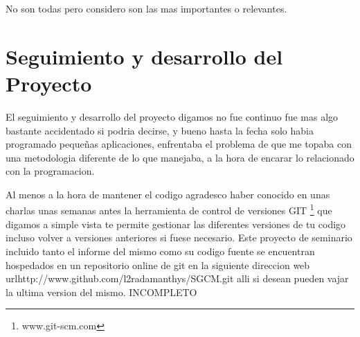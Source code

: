 No son todas pero considero son las mas importantes o relevantes.


\section{Seguimiento y desarrollo del Proyecto}

El seguimiento y desarrollo del proyecto digamos no fue continuo fue mas algo 
bastante accidentado si podria decirse, y bueno hasta la fecha solo habia 
programado pequeñas aplicaciones, enfrentaba el problema de que me topaba con 
una metodologia diferente de lo que manejaba, a la hora de encarar lo 
relacionado con la programacion. 

Al menos a la hora de mantener el codigo agradesco haber conocido en unas charlas
unas semanas antes la herramienta de control de versiones GIT \footnote{www.git-scm.com}
que digamos a simple vista te permite gestionar las diferentes versiones de tu codigo
incluso volver a versiones anteriores si fuese necesario. Este proyecto de seminario
incluido tanto el informe del mismo como su codigo fuente se encuentran hospedados
en un repositorio online de git en la siguiente direccion web 
url{http://www.github.com/l2radamanthys/SGCM.git} alli si desean pueden vajar la ultima
version del mismo.
INCOMPLETO


